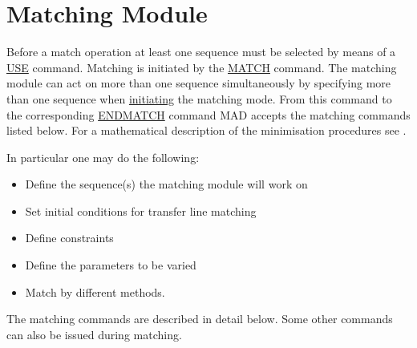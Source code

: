  
\chapter{Matching Module}
\label{chap:match}

Before a match operation at least one sequence must be selected by means
of a \href{../control/general.html#use}{USE} command. Matching is 
initiated by the \href{match_main.html}{MATCH} command. The matching
module can act on more than one sequence simultaneously by  specifying
more than one sequence when  \href{match_main.html#match}{initiating}
the matching mode.  From this command to the corresponding
\href{match_main.html#endmatch}{ENDMATCH} command MAD accepts the
matching commands listed below. For a mathematical description of the
minimisation procedures see \cite{MINUIT}. 

In particular one may do the following: 
\begin{itemize}
 \item Define the sequence(s) the matching module will work on 
 \item Set initial conditions for transfer line matching 
 \item Define constraints 
 \item Define the parameters to be varied 
 \item Match by different methods. 
\end{itemize}

The matching commands are described in detail below. Some other commands
can also be issued during matching.  

